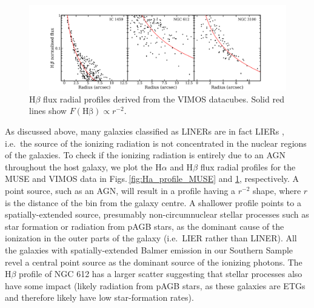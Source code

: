\documentclass[a4paper,fleqn,usenatbib]{mnras}
\begin{document}
			\begin{figure}
				\centering
				\includegraphics[width=\columnwidth]{Hbeta_profile.png}
				\caption{H$\beta$ flux radial profiles derived from the VIMOS datacubes. Solid red lines show $F(\mathrm{H\beta}) \propto r^{-2}$.}
				\label{fig:Hb_profile_VIMOS}
			\end{figure}
			
			As discussed above, many galaxies classified as LINERs are in fact LIERs \citep[see e.g.][]{Sarzi2005, Sarzi2010, Singh2013, Belfiore2016}, i.e.\ the source of the ionizing radiation is not concentrated in the nuclear regions of the galaxies. To check if the ionizing radiation is entirely due to an AGN throughout the host galaxy, we plot the H$\alpha$ and H$\beta$ flux radial profiles for the MUSE and VIMOS data in Figs.\,\ref{fig:Ha_profile_MUSE} and \ref{fig:Hb_profile_VIMOS}, respectively. A point source, such as an AGN, will result in a profile having a $r^{-2}$ shape, where $r$ is the distance of the bin from the galaxy centre. A shallower profile points to a spatially-extended source, presumably non-circumnuclear stellar processes such as star formation or radiation from pAGB stars, as the dominant cause of the ionization in the outer parts of the galaxy (i.e.\ LIER rather than LINER). All the galaxies with spatially-extended Balmer emission in our Southern Sample revel a central point source as the dominant source of the ionizing photons. The H$\beta$ profile of NGC 612 has a larger scatter suggesting that stellar processes also have some impact (likely radiation from pAGB stars, as these galaxies are ETGs and therefore likely have low star-formation rates).

			
\end{document}
